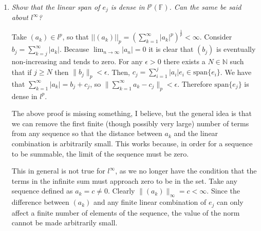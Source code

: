 \documentclass[11pt]{article}
\begin{document}
\begin{enumerate}
\item \emph{Show that the linear span of ${e_j}$ is dense in $l^p(\mathbb{F})$.  Can the same be said about $l^{\infty}$?}

Take $(a_k)\in l^{p}$, so that $||(a_{k})||_{p}=\left(\sum_{k=1}^{\infty}|a_k|^{p}\right)^{\frac{1}{p}}<\infty$. Consider $b_{j}=\sum_{k=j}^{\infty}|a_{k}|$. Because $\lim_{n \rightarrow \infty} |a_n| = 0$ it is clear that $(b_{j})$ is eventually non-increasing and tends to zero.  For any $\epsilon > 0$ there exists a $N \in \mathbb{N}$ such that if $j \geq N$ then $\|b_j\|_p<\epsilon$. Then, $c_j=\sum_{i=1}^{j}|a_{i}|e_{i}\in \mathrm{span} \{e_{i}\}$.  We have that $\sum_{k=1}^{\infty}|a_k| = b_j + c_j$, so $\|\sum_{k=1}^{\infty}a_k-c_j\|_{p}<\epsilon$. Therefore $\mathrm{span} \{e_{j}\}$ is dense in $l^p$. 

The above proof is missing something, I believe, but the general idea is that we can remove the first finite (though possibly very large) number of terms from any sequence so that the distance between $a_k$ and the linear combination is arbitrarily small.  This works because, in order for a sequence to be summable, the limit of the sequence must be zero.

This in general is not true for $l^{\infty}$, as we no longer have the condition that the terms in the infinite sum must approach zero to be in the set.  Take any sequence defined as $a_k = c \neq 0$.  Clearly $\|(a_k)\|_{\infty} = c < \infty$.  Since the difference between $(a_k)$ and any finite linear combination of $e_j$ can only affect a finite number of elements of the sequence, the value of the norm cannot be made arbitrarily small.
\end{enumerate}
\end{document}
